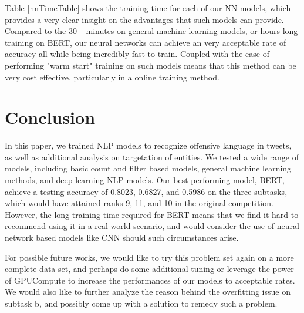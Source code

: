 \documentclass[a4paper, 12pt]{article}
\begin{document}
\begin{multicols}{2}
        Table \ref{nnTimeTable} shows the training time for each of our NN models, which provides a very clear insight on the advantages that such models can provide. Compared to the 30+ minutes on general machine learning models, or hours long training on BERT, our neural networks can achieve an very acceptable rate of accuracy all while being incredibly fast to train. Coupled with the ease of performing "warm start" training on such models means that this method can be very cost effective, particularly in a online training method.
    \end{multicols}
    
    \section{Conclusion}
    In this paper, we trained NLP models to recognize offensive language in tweets, as well as additional analysis on targetation of entities. We tested a wide range of models, including basic count and filter based models, general machine learning methods, and deep learning NLP models. Our best performing model, BERT, achieve a testing accuracy of 0.8023, 0.6827, and 0.5986 on the three subtasks, which would have attained ranks 9, 11, and 10 in the original competition. However, the long training time required for BERT means that we find it hard to recommend using it in a real world scenario, and would consider the use of neural network based models like CNN should such circumstances arise.

    For possible future works, we would like to try this problem set again on a more complete data set, and perhaps do some additional tuning or leverage the power of GPUCompute to increase the performances of our models to acceptable rates. We would also like to further analyze the reason behind the overfitting issue on subtask b, and possibly come up with a solution to remedy such a problem.

        \vskip 5cm
{}

\end{document}

